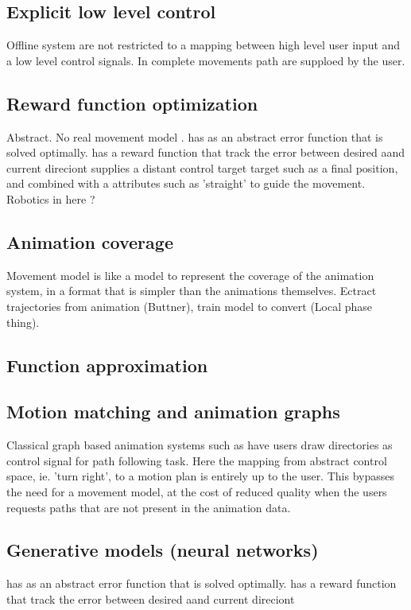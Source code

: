 \subsection{Explicit low level control}
Offline system are not restricted to a mapping between high level user input and a low level control signals. In \citep{treuille07} complete movements path are supploed by the user.

\subsection{Reward function optimization}
Abstract. No real movement model .
\citep{kovar02} has as an abstract error function that is solved optimally.
\citep{lee10} has a reward function that track the error between desired aand current direciont
\citep{lee18} supplies a distant control target target such as a final position, and combined with a attributes such as 'straight' to guide the movement.
Robotics in here ?

\subsection{Animation coverage}
Movement model is like a model to represent the coverage of the animation system, in a format that is simpler than the animations themselves. Ectract trajectories from animation (Buttner), train model to convert (Local phase thing). 

\subsection{Function approximation}


\subsection{Motion matching and animation graphs}
Classical graph based animation systems such as \citep{treuille07} have users draw directories as control signal for path following task. Here the mapping from abstract control space, ie. 'turn right', to a motion plan is entirely up to the user. This bypasses the need for a movement model, at the cost of reduced quality when the users requests paths that are not present in the animation data.




\subsection{Generative models (neural networks)}
\citep{kovar02} has as an abstract error function that is solved optimally.
\citep{lee10} has a reward function that track the error between desired aand current direciont

